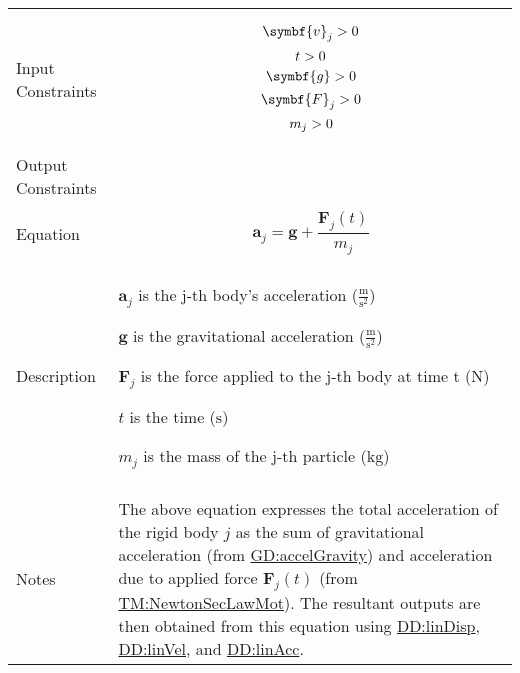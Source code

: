 \documentclass[12pt]{article}
\newcommand{\gt}{\ensuremath >}
\begin{document}
\begin{minipage}{\textwidth}
\begin{tabular}{>{\raggedright}p{}>{\raggedright\arraybackslash}p{}}
\\ \midrule \\
Input Constraints & \begin{displaymath}
                    {\symbf{v}_{j}}\gt{}0
                    \end{displaymath}
                    \begin{displaymath}
                    t\gt{}0
                    \end{displaymath}
                    \begin{displaymath}
                    \symbf{g}\gt{}0
                    \end{displaymath}
                    \begin{displaymath}
                    {\symbf{F}_{j}}\gt{}0
                    \end{displaymath}
                    \begin{displaymath}
                    {m_{j}}\gt{}0
                    \end{displaymath}
\\ \midrule \\
Output Constraints & 
\\ \midrule \\
Equation & \begin{displaymath}
           {\symbf{a}_{j}}=\symbf{g}+\frac{{\symbf{F}_{j}}\left(t\right)}{{m_{j}}}
           \end{displaymath}
\\ \midrule \\
Description & \begin{symbDescription}
              \item{${\symbf{a}_{j}}$ is the j-th body's acceleration ($\frac{\text{m}}{\text{s}^{2}}$)}
              \item{$\symbf{g}$ is the gravitational acceleration ($\frac{\text{m}}{\text{s}^{2}}$)}
              \item{${\symbf{F}_{j}}$ is the force applied to the j-th body at time t (${\text{N}}$)}
              \item{$t$ is the time (${\text{s}}$)}
              \item{${m_{j}}$ is the mass of the j-th particle (${\text{kg}}$)}
              \end{symbDescription}
\\ \midrule \\
Notes & The above equation expresses the total acceleration of the rigid body $j$ as the sum of gravitational acceleration (from \hyperref[GD:accelGravity]{GD:accelGravity}) and acceleration due to applied force ${\symbf{F}_{j}}\left(t\right)$ (from \hyperref[TM:NewtonSecLawMot]{TM:NewtonSecLawMot}). The resultant outputs are then obtained from this equation using \hyperref[DD:linDisp]{DD:linDisp}, \hyperref[DD:linVel]{DD:linVel}, and \hyperref[DD:linAcc]{DD:linAcc}.
        

\end{tabular}
\end{minipage}
\end{document}
